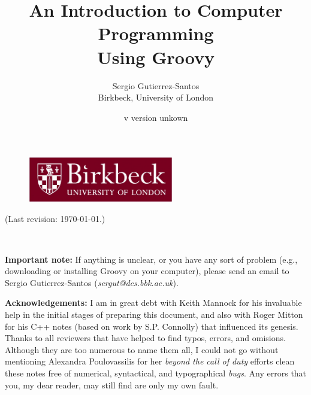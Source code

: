 \documentclass[11pt,a4paper]{article}
\title{An Introduction to Computer Programming\\
  Using Groovy} %
\author{Sergio Gutierrez-Santos\\
  Birkbeck, University of London}
\date{\InputIfFileExists{version.txt}
     {v}
     {version unkown}} %
\begin{document}

\maketitle

\thispagestyle{empty}

\vfill 

\begin{figure}[h!]  %
  \centering
  \includegraphics[height=2cm]{bbk.eps}
\end{figure}

\vfill



\noindent (Last revision: \today.)


\newpage

~\vspace{8cm}

\textbf{Important note: } If anything is unclear, or you have any 
sort of problem (e.g.,
downloading or installing Groovy on your computer), please send an
email to Sergio Gutierrez-Santos (\emph{sergut@dcs.bbk.ac.uk}).

\textbf{Acknowledgements: } I am in great debt with 
Keith Mannock for his invaluable help in the initial stages of
preparing this document, and also with Roger Mitton for his C++ notes
(based on work by S.P. Connolly) that influenced its genesis. 
Thanks to all reviewers that have helped to 
find typos, errors, and omisions. Although they are too numerous to
name them all, I could not go without mentioning Alexandra
Poulovassilis for her \emph{beyond the call of duty} efforts clean
these notes free of numerical, syntactical, and typographical
\emph{bugs}. Any errors that you, my dear reader, may still find are
only my own fault. 

\newpage


\newpage


\newpage
\end{document}
